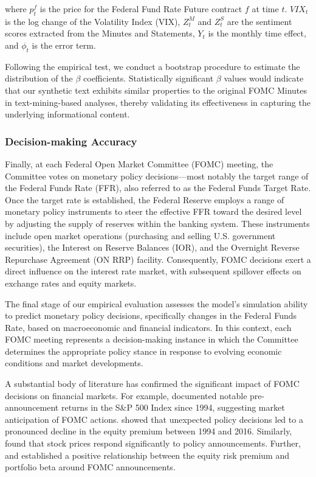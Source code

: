 where $p^f_t$ is the price for the Federal Fund Rate Future contract $f$ at time $t$. $VIX_t$ is the log change of the Volatility Index (VIX), $Z_t^M$ and $Z_t^S$ are the sentiment scores extracted from the Minutes and Statements, $Y_t$ is the monthly time effect, and $\phi_t$ is the error term.

Following the empirical test, we conduct a bootstrap procedure to estimate the distribution of the $\beta$ coefficients. Statistically significant $\beta$ values would indicate that our synthetic text exhibits similar properties to the original FOMC Minutes in text-mining-based analyses, thereby validating its effectiveness in capturing the underlying informational content.






\subsubsection*{Decision-making Accuracy}
Finally, at each Federal Open Market Committee (FOMC) meeting, the Committee votes on monetary policy decisions—most notably the target range of the Federal Funds Rate (FFR), also referred to as the Federal Funds Target Rate. Once the target rate is established, the Federal Reserve employs a range of monetary policy instruments to steer the effective FFR toward the desired level by adjusting the supply of reserves within the banking system. These instruments include open market operations (purchasing and selling U.S. government securities), the Interest on Reserve Balances (IOR), and the Overnight Reverse Repurchase Agreement (ON RRP) facility. Consequently, FOMC decisions exert a direct influence on the interest rate market, with subsequent spillover effects on exchange rates and equity markets.

The final stage of our empirical evaluation assesses the model’s simulation ability to predict monetary policy decisions, specifically changes in the Federal Funds Rate, based on macroeconomic and financial indicators. In this context, each FOMC meeting represents a decision-making instance in which the Committee determines the appropriate policy stance in response to evolving economic conditions and market developments.


A substantial body of literature has confirmed the significant impact of FOMC decisions on financial markets. For example, \cite{lucca2015pre} documented notable pre-announcement returns in the S\&P 500 Index since 1994, suggesting market anticipation of FOMC actions. \cite{cieslak2019stock} showed that unexpected policy decisions led to a pronounced decline in the equity premium between 1994 and 2016. Similarly, \cite{madeira2019effect} found that stock prices respond significantly to policy announcements. Further, \cite{bodilsen2021asset} and \cite{liu2022recovering} established a positive relationship between the equity risk premium and portfolio beta around FOMC announcements.



